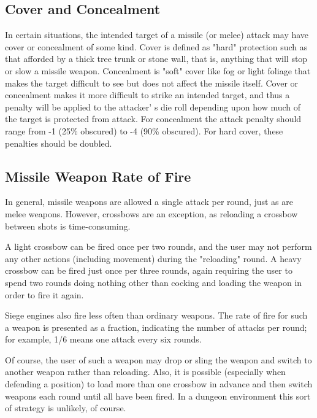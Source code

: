 \documentclass[a4paper,twoside,openany,10pt]{book}
\begin{document}
\begin{multicols}{2}
\subsection{Cover and Concealment}\label{cover-and-concealment}

In certain situations, the intended target of a missile (or melee) attack may have cover or concealment of some kind. Cover is defined as "hard" protection such as that afforded by a thick tree trunk or stone wall, that is, anything that will stop or slow a missile weapon. Concealment is "soft" cover like fog or light foliage that makes the target difficult to see but does not affect the missile itself. Cover or concealment makes it more difficult to strike an intended target, and thus a penalty will be applied to the attacker' s die roll depending upon how much of the target is protected from attack. For concealment the attack penalty should range from -1 (25\% obscured) to -4 (90\% obscured). For hard cover, these penalties should be doubled. 

\subsection{Missile Weapon Rate of Fire}\label{missile-weapon-rate-of-fire}

In general, missile weapons are allowed a single attack per round, just as are melee weapons. However, crossbows are an exception, as reloading a crossbow between shots is time-consuming.

A light crossbow can be fired once per two rounds, and the user may not perform any other actions (including movement) during the "reloading" round. A heavy crossbow can be fired just once per three rounds, again requiring the user to spend two rounds doing nothing other than cocking and loading the weapon in order to fire it again.

Siege engines also fire less often than ordinary weapons. The rate of fire for such a weapon is presented as a fraction, indicating the number of attacks per round; for example, 1/6 means one attack every six rounds.

Of course, the user of such a weapon may drop or sling the weapon and switch to another weapon rather than reloading. Also, it is possible (especially when defending a position) to load more than one crossbow in advance and then switch weapons each round until all have been fired. In a dungeon environment this sort of strategy is unlikely, of course.


\end{multicols}
\end{document}
